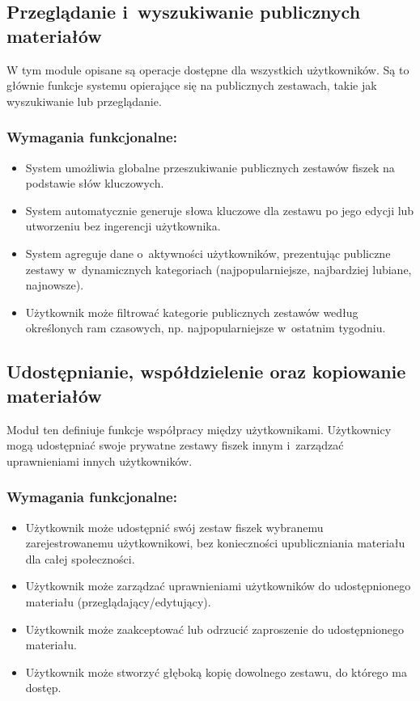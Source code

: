 \subsection*{Przeglądanie i~wyszukiwanie publicznych materiałów}
W tym module opisane są operacje dostępne dla wszystkich użytkowników. Są to głównie funkcje systemu opierające się na
publicznych zestawach, takie jak wyszukiwanie lub przeglądanie.

\subsubsection*{Wymagania funkcjonalne:}
\begin{itemize}
    \item System umożliwia globalne przeszukiwanie publicznych zestawów fiszek na podstawie słów kluczowych.
    \item System automatycznie generuje słowa kluczowe dla zestawu po jego edycji lub utworzeniu bez ingerencji użytkownika.
    \item System agreguje dane o~aktywności użytkowników, prezentując publiczne zestawy w~dynamicznych kategoriach 
    (najpopularniejsze, najbardziej lubiane, najnowsze).
    \item Użytkownik może filtrować kategorie publicznych zestawów według określonych ram czasowych, np. najpopularniejsze w~ostatnim tygodniu. 
\end{itemize}

\subsection*{Udostępnianie, współdzielenie oraz kopiowanie materiałów}
Moduł ten definiuje funkcje współpracy między użytkownikami.
Użytkownicy mogą udostępniać swoje prywatne zestawy fiszek innym i~zarządzać uprawnieniami innych użytkowników.

\subsubsection*{Wymagania funkcjonalne:}
\begin{itemize}
    \item Użytkownik może udostępnić swój zestaw fiszek wybranemu zarejestrowanemu użytkownikowi, bez konieczności upubliczniania materiału 
    dla całej społeczności. 
    \item Użytkownik może zarządzać uprawnieniami użytkowników do udostępnionego materiału (przeglądający/edytujący).
    \item Użytkownik może zaakceptować lub odrzucić zaproszenie do udostępnionego materiału.
    \item Użytkownik może stworzyć głęboką kopię dowolnego zestawu, do którego ma dostęp.
\end{itemize}

